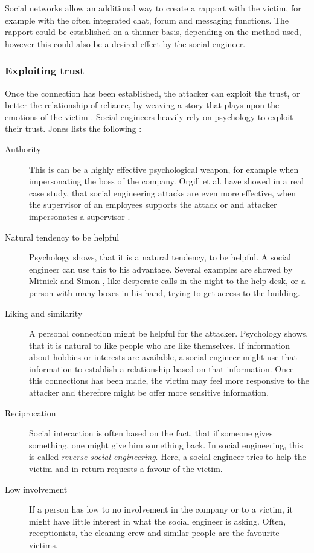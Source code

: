 Social networks allow an additional way to create a rapport with the victim,
for example with the often integrated chat, forum and messaging functions. The
rapport could be established on a thinner basis, depending on the method used,
however this could also be a desired effect by the social engineer.


\subsubsection{Exploiting trust}

Once the connection has been established, the attacker can exploit the trust,
or better the relationship of reliance, by \glqq{}weaving a story that plays
upon the emotions of the victim\grqq{} \cite{thornburgh2004}. Social engineers
heavily rely on psychology to exploit their trust. Jones lists the following
\cite{jones2004}:

\begin{description}
\item[Authority] This is can be a highly effective psychological weapon, for
  example when impersonating the boss of the company. Orgill et al. have
  showed in a real case study, that social engineering attacks are even more
  effective, when the supervisor of an employees supports the attack or and
  attacker impersonates a supervisor \cite{orgill2004}.
\item[Natural tendency to be helpful] Psychology shows, that it is a natural
  tendency, to be helpful. A social engineer can use this to his advantage.
  Several examples are showed by Mitnick and Simon \cite{mitnick2003}, like
  desperate calls in the night to the help desk, or a person with many boxes
  in his hand, trying to get access to the building.
\item[Liking and similarity] A personal connection might be helpful for the
  attacker. Psychology shows, that it is natural to like people who are like
  themselves. If information about hobbies or interests are available, a social
  engineer might use that information to establish a relationship based on that
  information. Once this connections has been made, the victim may feel more
  responsive to the attacker and therefore might be offer more sensitive
  information.
\item[Reciprocation] Social interaction is often based on the fact, that if
  someone gives something, one might give him something back. In social
  engineering, this is called \textit{reverse social engineering}. Here, a
  social engineer tries to help the victim and in return requests a favour of
  the victim.
\item[Low involvement] If a person has low to no involvement in the company or
  to a victim, it might have little interest in what the social engineer is
  asking. Often, receptionists, the cleaning crew and similar people are the
  favourite victims.
\end{description}


